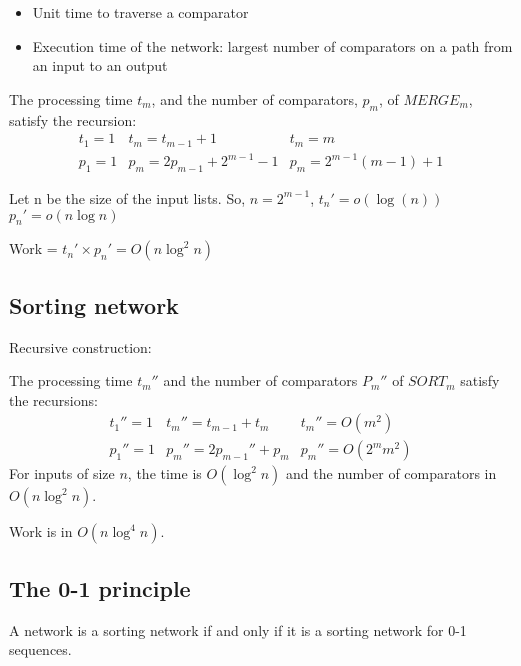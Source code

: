 \begin{itemize}
\item Unit time to traverse a comparator
\item Execution time of the network: largest number of comparators on a path from an input to an output
\end{itemize}

\begin{lemma}
The processing time $t_m$, and the number of comparators, $p_m$, of $MERGE_m$, satisfy the recursion:
\begin{align*}
t_1=1 & t_m=t_{m-1}+1 & t_m=m\\
p_1=1 & p_m=2p_{m-1} +2^{m-1}-1 & p_m=2^{m-1}(m-1)+1
\end{align*}

Let n be the size of the input lists.
So, $n=2^{m-1}$, $t_n'=o(\log (n))$ $p_n' = o(n\log n)$

Work = $t_n'\times p_n'=O(n\log^2 n)$
\end{lemma}


\subsection{Sorting network}
Recursive construction:


\begin{lemma}
The processing time $t_m''$ and the number of comparators $P_m''$ of $SORT_m$ satisfy the recursions:
\begin{align*}
t_1''=1 & t_m''=t_{m-1}+t_m & t_m''=O(m^2)\\
p_1''=1 & p_m''=2p_{m-1}''+p_m & p_m''=O(2^m m^2)
\end{align*}
For inputs of size $n$, the time is $O(\log^2 n)$ and the number of comparators in $O(n\log^2 n)$.

Work is in $O(n \log^4 n)$.

\end{lemma}

\subsection{The 0-1 principle}
\begin{prop}
A network is a sorting network if and only if it is a sorting network for 0-1 sequences.
\end{prop}

